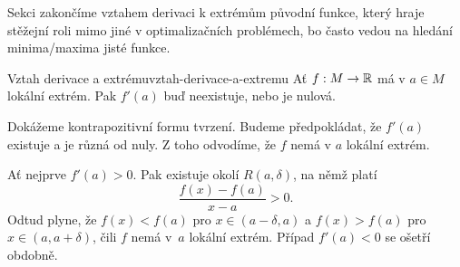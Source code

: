 Sekci zakončíme vztahem derivaci k extrémům původní funkce, který hraje stěžejní
roli mimo jiné v optimalizačních problémech, bo často vedou na hledání
minima/maxima jisté funkce.

\begin{proposition}{Vztah derivace a extrému}{vztah-derivace-a-extremu}
 Ať $f:M \to \mathbb{R}$ má v $a \in M$ lokální extrém. Pak $f'(a)$ buď neexistuje, nebo
 je nulová.
\end{proposition}
\begin{propproof}
 Dokážeme kontrapozitivní formu tvrzení. Budeme předpokládat, že $f'(a)$
 existuje a je různá od nuly. Z toho odvodíme, že $f$ nemá v $a$ lokální extrém.

 Ať nejprve $f'(a) > 0$. Pak existuje okolí $R(a,\delta)$, na němž platí
 \[
  \frac{f(x) - f(a)}{x - a} > 0.
 \]
 Odtud plyne, že $f(x) < f(a)$ pro $x \in (a - \delta,a)$ a $f(x) > f(a)$ pro $x
 \in (a,a+\delta)$, čili $f$ nemá v~$a$ lokální extrém. Případ $f'(a) < 0$ se
 ošetří obdobně.
\end{propproof}
